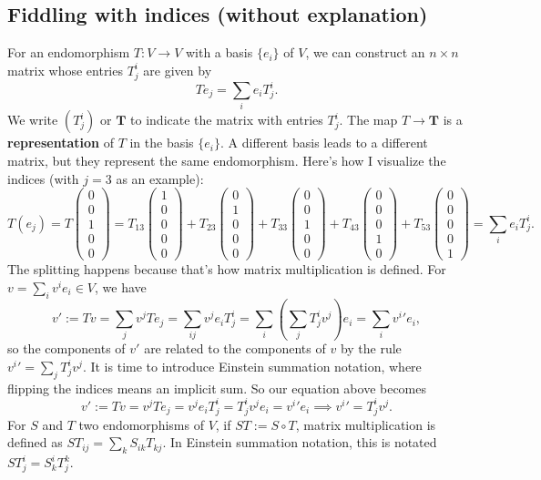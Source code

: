 \subsection{Fiddling with indices (without explanation)}
For an endomorphism $T \colon V \to V$ with a basis $\{e_i \} $ of $V$, we can construct an $n\times n$ matrix whose entries $T_{j}^i $ are given by \[
Te_j =\sum_i e_i T_{j}^i .
\]
We write $(T_{j}^i )$ or $\mathbf T$ to indicate the matrix with entries $T^i _j $. The map $T \to \mathbf T$ is a \textbf{representation} of $T$ in the basis $\{e_i \} $. A different basis leads to a different matrix, but they represent the same endomorphism. Here's how I visualize the indices (with $j=3$ as an example): \[
T\left( e_j  \right) =T
\begin{pmatrix}
    0\\0\\1\\0\\0
\end{pmatrix}=T_{13}
\begin{pmatrix}
    1\\0\\0\\0\\0
\end{pmatrix}+T_{23}\begin{pmatrix}
    0\\1\\0\\0\\0
\end{pmatrix}+T_{33}\begin{pmatrix}
    0\\0\\1\\0\\0
\end{pmatrix}+T_{43}\begin{pmatrix}
    0\\0\\0\\1\\0
\end{pmatrix}+T_{53}\begin{pmatrix}
    0\\0\\0\\0\\1
\end{pmatrix}=\sum_i e_i T_j ^i .
\] The splitting happens because that's how matrix multiplication is defined. For $v=\sum_i v^i e_i \in V$, we have \[
v':=Tv=\sum_j v^j Te_j =\sum _{ij}v^j e_i T_j ^i =\sum_i \left( \sum_j T^i _j v^j  \right) e_i =\sum_i {v^i } 'e_i ,
\] so the components of $v'$ are related to the components of $v$ by the rule ${v^i } '=\sum _j T_j ^i v^j $. It is time to introduce Einstein summation notation, where flipping the indices means an implicit sum. So our equation above becomes \[
v':=Tv=v^j Te_j =v^j e_i T^i _j =T_j ^i v^j e_i ={v^i } 'e_i \implies {v^i } '=T_j ^i v^j .
\] For $S$ and $T$ two endomorphisms of $V$, if $ST:= S \circ T$, matrix multiplication is defined as $ST_{ij}=\sum_k S_{ik}T_{kj}$. In Einstein summation notation, this is notated $ST_j ^i =S^i _kT^k_j $.
